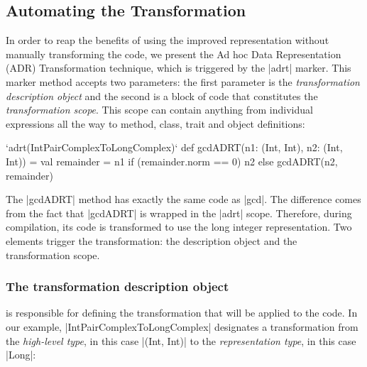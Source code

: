 \subsection{Automating the Transformation}
\label{sec:automating}

In order to reap the benefits of using the improved representation
without manually transforming the code, we present the Ad hoc Data
Representation (ADR) Transformation technique, which is triggered
by the |adrt| marker. This marker method accepts two parameters: the
first parameter is the \emph{transformation description object} and the
second is a block of code that constitutes the \emph{transformation scope}. This
scope can contain anything from individual expressions all the way to method, class,
trait and object definitions:

\begin{lstlisting-nobreak}
`adrt(IntPairComplexToLongComplex)` {
  def gcdADRT(n1: (Int, Int), n2: (Int, Int)) = {
    val remainder = n1 %
    if (remainder.norm == 0) n2 else gcdADRT(n2, remainder)
  }
}
\end{lstlisting-nobreak}


The |gcdADRT| method has exactly the same code as |gcd|. The difference comes from the fact that |gcdADRT| is wrapped in the |adrt| scope. Therefore, during compilation, its code is transformed to use the long integer representation. Two elements trigger the transformation: the  description object and the transformation scope.

\subsubsection{The transformation description object} is responsible for defining the transformation that will be applied to the code. In our example, |IntPairComplexToLongComplex| designates a transformation from the \emph{high-level type}, in this case |(Int, Int)| to the \emph{representation type}, in this case |Long|:

